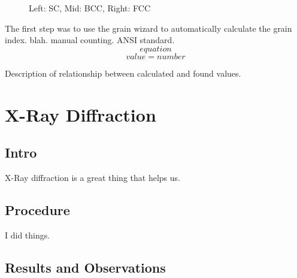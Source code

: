 \documentclass{article}
\begin{document}
\begin{figure}[h]
\begin{minipage}{0.32\textwidth}
	\end{minipage}
	\caption{Left: SC, Mid: BCC, Right: FCC}
\end{figure}

The first step was to use the grain wizard to automatically calculate the grain index. blah. manual counting. ANSI standard.
$$equation$$
$$value = number$$

Description of relationship between calculated and found values.

\section{X-Ray Diffraction}

\subsection{Intro}

X-Ray diffraction is a great thing that helps us.

\subsection{Procedure}

I did things.

\subsection{Results and Observations}
\end{document}

